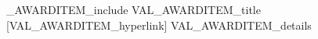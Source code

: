         \ifVAL_AWARDITEM_include%
        {VAL_AWARDITEM_title}%
        [VAL_AWARDITEM_hyperlink]%
        VAL_AWARDITEM_details%
        \fi%
